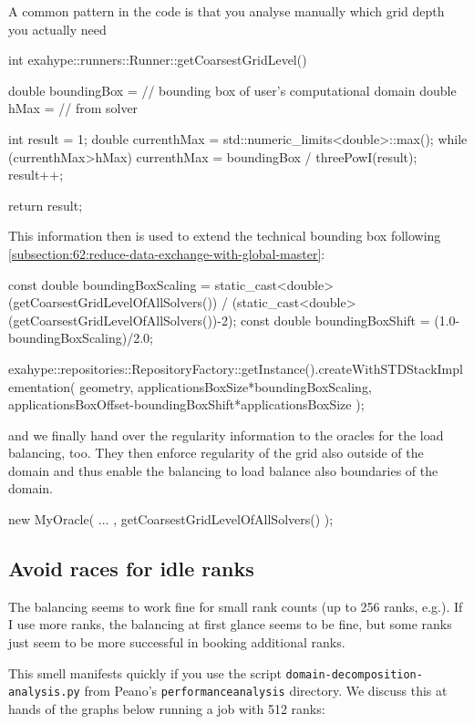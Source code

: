 \noindent
A common pattern in the code is that you analyse manually which grid depth you
actually need
\begin{code}
int exahype::runners::Runner::getCoarsestGridLevel() {
  double boundingBox =  // bounding box of user's computational domain
  double hMax        =  // from solver

  int    result      = 1;
  double currenthMax = std::numeric_limits<double>::max();
  while (currenthMax>hMax) {
    currenthMax = boundingBox / threePowI(result);
    result++;
  }

  return result;
}
\end{code}

\noindent
This information then is used to extend the technical bounding box following  
\ref{subsection:62:reduce-data-exchange-with-global-master}:
\begin{code}
  const double boundingBoxScaling = 
    static_cast<double>(getCoarsestGridLevelOfAllSolvers()) /
    (static_cast<double>(getCoarsestGridLevelOfAllSolvers())-2); 
  const double boundingBoxShift   = (1.0-boundingBoxScaling)/2.0; 
  
  exahype::repositories::RepositoryFactory::getInstance().createWithSTDStackImplementation(
      geometry,
      applicationsBoxSize*boundingBoxScaling,
      applicationsBoxOffset-boundingBoxShift*applicationsBoxSize
      );
\end{code}

\noindent
and we finally hand over the regularity information to the oracles for the load
balancing, too.
They then enforce regularity of the grid also outside of the domain and thus
enable the balancing to load balance also boundaries of the domain.
\begin{code}
  new MyOracle( ... , getCoarsestGridLevelOfAllSolvers() );
\end{code}


\subsection{Avoid races for idle ranks}

\begin{smell}
  The balancing seems to work fine for small rank counts (up to 256 ranks,
  e.g.). If I use more ranks, the balancing at first glance seems to be fine,
  but some ranks just seem to be more successful in booking additional ranks.
\end{smell}

\noindent
This smell manifests quickly if you use the script
\texttt{domain-decomposition-analysis.py} from Peano's
\texttt{performanceanalysis} directory. 
We discuss this at hands of the graphs below running a job with 512 ranks: 

